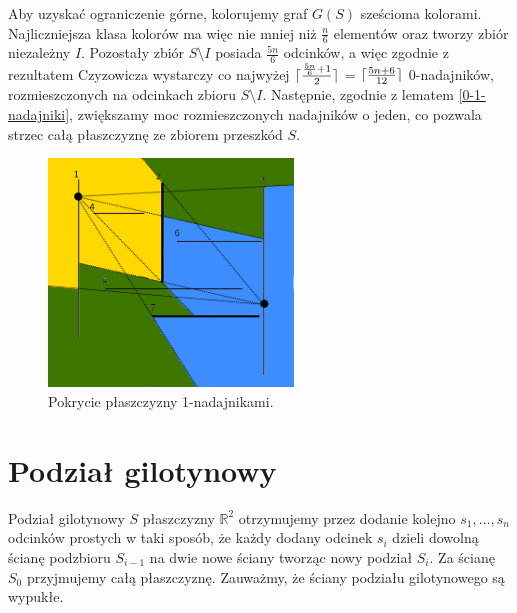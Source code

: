 \documentclass[brudnopis]{xmgr}
\DeclarePairedDelimiter\ceil{\lceil}{\rceil}
\theoremstyle{definition}
\begin{document}
\indent Aby uzyskać ograniczenie górne, kolorujemy graf $G(S)$ sześcioma kolorami. Najliczniejsza klasa kolorów ma więc nie mniej niż $\frac{n}{6}$ elementów oraz tworzy zbiór niezależny $I$. Pozostały zbiór $S \setminus I$ posiada $\frac{5n}{6}$ odcinków, a więc zgodnie z rezultatem Czyzowicza wystarczy co najwyżej $\ceil{\frac{\frac{5n}{6} + 1}{2}}$ = $\ceil{\frac{5n+6}{12}}$ 0-nadajników, rozmieszczonych na odcinkach zbioru $S \setminus I$. Następnie, zgodnie z lematem \ref{0-1-nadajniki}, zwiększamy moc rozmieszczonych nadajników o jeden, co pozwala strzec całą płaszczyznę ze zbiorem przeszkód $S$.
\begin{figure}[ht!]
  \centering
  \includegraphics[width=6.5cm]{rysunki/pokrycie_nadajnikami.png}
  \caption{Pokrycie płaszczyzny 1-nadajnikami.}
  \label{fig:pokrycie plaszczyzny}
\end{figure} 

\section{Podział gilotynowy}
Podział gilotynowy $S$ płaszczyzny $\mathbb{R}^2$ otrzymujemy przez dodanie kolejno $s_1,\ldots,s_n$ odcinków prostych w taki sposób, że każdy dodany odcinek $s_i$ dzieli dowolną ścianę podzbioru $S_{i-1}$ na dwie nowe ściany tworząc nowy podział $S_i$. Za ścianę $S_0$ przyjmujemy całą płaszczyznę. Zauważmy, że ściany podziału gilotynowego są wypukłe.
\end{document}
